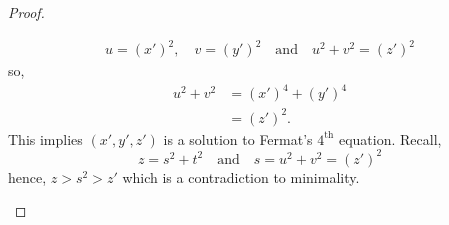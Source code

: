 \documentclass[12pt, a4paper]{article}
\begin{document}
\begin{proof}
\begin{itemize}
        \[\begin{aligned}
            u=(x')^2, \quad v=(y')^2 \quad \text{and} \quad u^2+v^2 =(z')^2
        \end{aligned}\]
        so,
        \[\begin{aligned}
            u^2+v^2 &= (x')^4+(y')^4 \\
                    &= (z')^2.
        \end{aligned}\]
        This implies \((x',y',z')\) is a solution to Fermat's \(4^{\text{th}}\) equation. Recall,
        \[z=s^2+t^2 \quad \text{and} \quad s=u^2+v^2=(z')^2\]
        hence, \(z>s^2>z'\) which is a contradiction to minimality.
    \end{itemize}
\end{proof}


\end{document}
